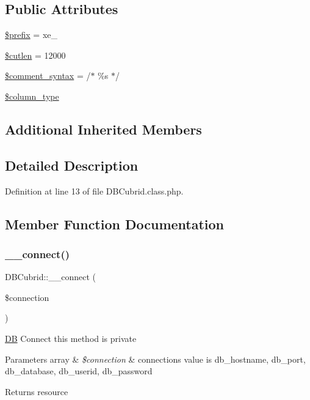 \subsection*{Public Attributes}
\begin{DoxyCompactItemize}
\item 
\hyperlink{classDBCubrid_a78aa323ac3bf494cbc63d3a2ae05a6f5}{\$prefix} = \textquotesingle{}xe\+\_\+\textquotesingle{}
\item 
\hyperlink{classDBCubrid_a0f61a81aecf7cd9829d0fc390b2895a5}{\$cutlen} = 12000
\item 
\hyperlink{classDBCubrid_a0060c7dcaf443efddbe4492d4479fe0b}{\$comment\+\_\+syntax} = \textquotesingle{}/$\ast$ \%s $\ast$/\textquotesingle{}
\item 
\hyperlink{classDBCubrid_a92995e5eed892ec4076cb3c1f5fdb2f1}{\$column\+\_\+type}
\end{DoxyCompactItemize}
\subsection*{Additional Inherited Members}


\subsection{Detailed Description}


Definition at line 13 of file D\+B\+Cubrid.\+class.\+php.



\subsection{Member Function Documentation}
\mbox{\label{classDBCubrid_aa0798dadf20548b2c38e925f391c72f2}} 
\subsubsection{\texorpdfstring{\+\_\+\+\_\+connect()}{\_\_connect()}}
{\footnotesize\ttfamily D\+B\+Cubrid\+::\+\_\+\+\_\+connect (\begin{DoxyParamCaption}\item[{}]{\$connection }\end{DoxyParamCaption})}

\hyperlink{classDB}{DB} Connect this method is private 
\begin{DoxyParams}[1]{Parameters}
array & {\em \$connection} & connection\textquotesingle{}s value is db\+\_\+hostname, db\+\_\+port, db\+\_\+database, db\+\_\+userid, db\+\_\+password \\
\hline
\end{DoxyParams}
\begin{DoxyReturn}{Returns}
resource 
\end{DoxyReturn}


